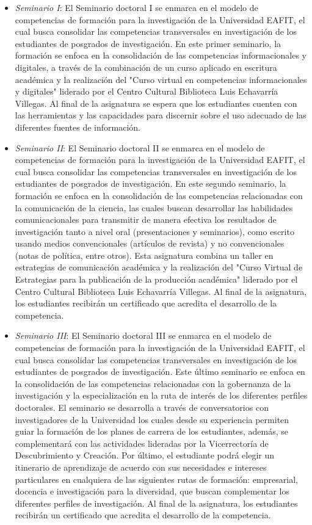 \begin{itemize}
\item 	\emph{Seminario I}: El Seminario doctoral I se enmarca en el modelo de competencias de formación para la investigación de la Universidad EAFIT, el cual busca consolidar las competencias transversales en investigación de los estudiantes de posgrados de investigación. En este primer seminario, la formación se enfoca en la consolidación de las competencias informacionales y digitales, a través de la combinación de un curso aplicado en escritura académica y la realización del "Curso virtual en competencias informacionales y digitales" liderado por el Centro Cultural Biblioteca Luis Echavarría Villegas. Al final de la asignatura se espera que los estudiantes cuenten con las herramientas y las capacidades para discernir sobre el uso adecuado de las diferentes fuentes de información.
\item 	\emph{Seminario II}: El Seminario doctoral II se enmarca en el modelo de competencias de formación para la investigación de la Universidad EAFIT, el cual busca consolidar las competencias transversales en investigación de los estudiantes de posgrados de investigación. En este segundo seminario, la formación se enfoca en la consolidación de las competencias relacionadas con la comunicación de la ciencia, las cuales buscan desarrollar las habilidades comunicacionales para transmitir de manera efectiva los resultados de investigación tanto a nivel oral (presentaciones y seminarios), como escrito usando medios convencionales (artículos de revista) y no convencionales (notas de política, entre otros). Esta asignatura combina un taller en estrategias de comunicación académica y la realización del "Curso Virtual de Estrategias para la publicación de la producción académica" liderado por el Centro Cultural Biblioteca Luis Echavarría Villegas. Al final de la asignatura, los estudiantes recibirán un certificado que acredita el desarrollo de la competencia. 
\item 	\emph{Seminario III}: El Seminario doctoral III se enmarca en el modelo de competencias de formación para la investigación de la Universidad EAFIT, el cual busca consolidar las competencias transversales en investigación de los estudiantes de posgrados de investigación. Este último seminario se enfoca en la consolidación de las competencias relacionadas con la gobernanza de la investigación y la especialización en la ruta de interés de los diferentes perfiles doctorales. El seminario se desarrolla a través de conversatorios con investigadores de la Universidad los cuales desde su experiencia permiten guiar la formación de los planes de carrera de los estudiantes, además, se complementará con las actividades lideradas por la Vicerrectoría de Descubrimiento y Creación. Por último, el estudiante podrá elegir un itinerario de aprendizaje de acuerdo con sus necesidades e intereses particulares en cualquiera de las siguientes rutas de formación:  empresarial, docencia e investigación para la diversidad, que buscan complementar los diferentes perfiles de investigación. Al final de la asignatura, los estudiantes recibirán un certificado que acredita el desarrollo de la competencia.
\end{itemize}

